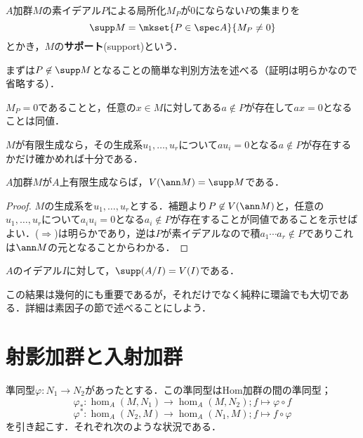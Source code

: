 \begin{defi}[サポート]\label{defi:support}
	$A$加群$M$の素イデアル$ P$による局所化$M_P$が0にならない$ P$の集まりを
	\[\supp M=\mkset{ P\in\spec A}{M_ P\neq 0}\]
	とかき，$M$の\textbf{サポート}(support)という．
\end{defi}

まずは$P\not\in\supp M$となることの簡単な判別方法を述べる（証明は明らかなので省略する）．

\begin{lem}\label{lem:M_p=0との同値条件}
	$M_P=0$であることと，任意の$x\in M$に対してある$a\not\in P$が存在して$ax=0$となることは同値．
\end{lem}

$M$が有限生成なら，その生成系$u_1,\dots,u_r$について$au_i=0$となる$a\not\in P$が存在するかだけ確かめれば十分である．

\begin{prop}\label{prop:Zariskiの閉集合とsupp}
	$A$加群$M$が$A$上有限生成ならば，$V(\ann M)=\supp M$である．
\end{prop}

\begin{proof}
	$M$の生成系を$u_1,\dots,u_r$とする．補題より$P\not\in V(\ann M)$と，任意の$u_1,\dots,u_r$について$a_iu_i=0$となる$a_i\not\in P$が存在することが同値であることを示せばよい．($\Longrightarrow$)は明らかであり，逆は$P$が素イデアルなので積$a_1\cdots a_r\not\in P$でありこれは$\ann M$の元となることからわかる．
\end{proof}
\begin{cor}\label{cor:supp A/I}
	$A$のイデアル$I$に対して，$\supp (A/I)=V(I)$である．
\end{cor}

この結果は幾何的にも重要であるが，それだけでなく純粋に環論でも大切である．詳細は素因子の節で述べることにしよう．

\section{射影加群と入射加群}

準同型$\varphi:N_1\to N_2$があったとする．この準同型はHom加群の間の準同型；
\[\varphi_\ast :\hom_A(M,N_1)\to\hom_A(M,N_2);f\mapsto \varphi\circ f\]
\[\varphi^\ast :\hom_A(N_2,M)\to\hom_A(N_1,M);f\mapsto f\circ \varphi\]
を引き起こす．それぞれ次のような状況である．

